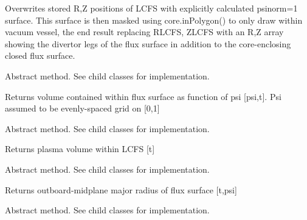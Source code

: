\documentclass[letterpaper,10pt,english]{sphinxmanual}
\begin{document}
\begin{fulllineitems}
\begin{fulllineitems}
Overwrites stored R,Z positions of LCFS with explicitly calculated psinorm=1
surface.  This surface is then masked using core.inPolygon() to only draw within
vacuum vessel, the end result replacing RLCFS, ZLCFS with an R,Z array showing
the divertor legs of the flux surface in addition to the core-enclosing closed
flux surface.

\end{fulllineitems}


\begin{fulllineitems}
\label{eqtools:eqtools.core.Equilibrium.getFluxVol}
Abstract method.  See child classes for implementation.

Returns volume contained within flux surface as function of psi {[}psi,t{]}.
Psi assumed to be evenly-spaced grid on {[}0,1{]}

\end{fulllineitems}


\begin{fulllineitems}
\label{eqtools:eqtools.core.Equilibrium.getVolLCFS}
Abstract method.  See child classes for implementation.

Returns plasma volume within LCFS {[}t{]}

\end{fulllineitems}


\begin{fulllineitems}
\label{eqtools:eqtools.core.Equilibrium.getRmidPsi}
Abstract method.  See child classes for implementation.

Returns outboard-midplane major radius of flux surface {[}t,psi{]}

\end{fulllineitems}


\begin{fulllineitems}
\label{eqtools:eqtools.core.Equilibrium.getFluxPres}
Abstract method.  See child classes for implementation.


\end{fulllineitems}
\end{fulllineitems}
\end{document}
